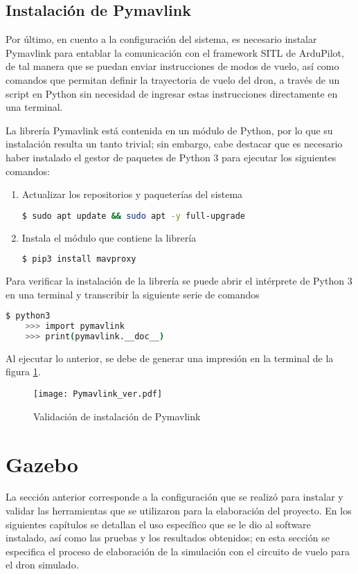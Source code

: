 \subsection{Instalación de Pymavlink}
Por último, en cuento a la configuración del sistema, es necesario instalar Pymavlink para entablar la comunicación con el framework SITL de ArduPilot, de tal manera que se puedan enviar instrucciones de modos de vuelo, así como comandos que permitan definir la trayectoria de vuelo del dron, a través de un script en Python sin necesidad de ingresar estas instrucciones directamente en una terminal.

La librería Pymavlink está contenida en un módulo de Python, por lo que su instalación resulta un tanto trivial; sin embargo, cabe destacar que es necesario haber instalado el gestor de paquetes de Python 3 para ejecutar los siguientes comandos:

\begin{enumerate}
    \item Actualizar los repositorios y paqueterías del sistema
    \begin{lstlisting}[language = bash]
        $ sudo apt update && sudo apt -y full-upgrade
    \end{lstlisting} 
    
    \item Instala el módulo que contiene la librería
    \begin{lstlisting}[language = bash]
        $ pip3 install mavproxy
    \end{lstlisting} 
\end{enumerate}

Para verificar la instalación de la librería se puede abrir el intérprete de Python 3 en una terminal y transcribir la siguiente serie de comandos

\begin{lstlisting}[language = bash]
    $ python3
    >>> import pymavlink
    >>> print(pymavlink.__doc__)
\end{lstlisting} 

Al ejecutar lo anterior, se debe de generar una impresión en la terminal de la figura \ref{fig:Pymavlink_ver}.

\begin{figure}[ht]
    \centering
    \texttt{[image: Pymavlink\_ver.pdf]}
    \caption{Validación de instalación de Pymavlink}
    \label{fig:Pymavlink_ver}
\end{figure}


\section{Gazebo}
La sección anterior corresponde a la configuración que se realizó para instalar y validar las herramientas que se utilizaron para la elaboración del proyecto. En los siguientes capítulos se detallan el uso específico que se le dio al software instalado, así como las pruebas y los resultados obtenidos; en esta sección se especifica el proceso de elaboración de la simulación con el circuito de vuelo para el dron simulado.


